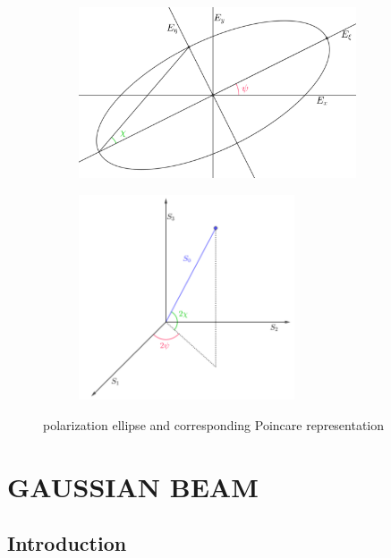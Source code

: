 \documentclass[11pt,a4paper]{article}
\numberwithin{equation}{section}
\begin{document}
\begin{figure}[H]
	\begin{subfigure}[H]{0.48\textwidth}
		\centering
		\includegraphics[width=0.9\textwidth]{ellipse_new}
		\caption{}
	\end{subfigure}
	\hfill
	\begin{subfigure}[H]{0.48\textwidth}
		\centering
		\includegraphics[width=0.7\textwidth]{poincare}
		\caption{}
	\end{subfigure}
	\caption{polarization ellipse and corresponding Poincare representation}
	\label{fig:compare poincare}
\end{figure}

\clearpage



\section{GAUSSIAN BEAM}
\subsection{Introduction}
\end{document}
